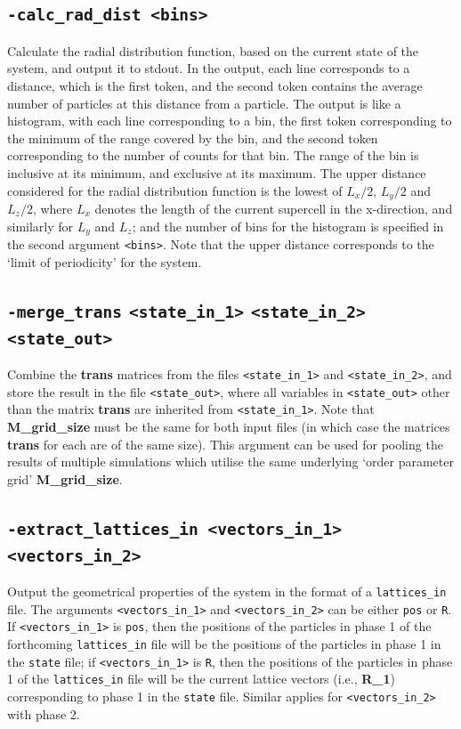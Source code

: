 \documentclass{report}
\begin{document}
\subsection{\texttt{-calc\_rad\_dist <bins>}}
Calculate the radial distribution function, based on the current state of the system, and output it to stdout. In the output, each line corresponds 
to a distance, which is the first token, and the second token contains the average number of particles at this distance from a particle. The 
output is like a histogram, with each line corresponding to a bin, the first token corresponding to the minimum of the range covered by the 
bin, and the second token corresponding to the number of counts for that bin. The range of the bin is inclusive at its minimum, and 
exclusive at its maximum. The upper distance considered for the radial distribution function is the lowest of $L_x/2$, $L_y/2$ and $L_z/2$,
where $L_x$ denotes the length of the current supercell in the x-direction, and similarly for $L_y$ and $L_z$; and the number of bins for 
the histogram is specified in the second argument \texttt{<bins>}. Note that the upper distance corresponds to the `limit of periodicity' for the system. 

\subsection{\texttt{-merge\_trans} \texttt{<state\_in\_1>}  \texttt{<state\_in\_2>} \texttt{<state\_out>}}
Combine the \textbf{trans} matrices from the files \texttt{<state\_in\_1>} and \texttt{<state\_in\_2>}, and store the result in the 
file \texttt{<state\_out>}, where all variables in \texttt{<state\_out>} other than the matrix \textbf{trans} are inherited from 
\texttt{<state\_in\_1>}. Note that \textbf{M\_grid\_size} must be the same for both input files (in which case the matrices \textbf{trans} for
each are of the same size). This argument can be used for pooling the results of multiple simulations which utilise the same underlying
`order parameter grid' \textbf{M\_grid\_size}.

\subsection{\texttt{-extract\_lattices\_in <vectors\_in\_1> <vectors\_in\_2>}}
Output the geometrical properties of the system in the format of a \texttt{lattices\_in} file. The arguments \texttt{<vectors\_in\_1>}
and \texttt{<vectors\_in\_2>} can be either \texttt{pos} or \texttt{R}. If \texttt{<vectors\_in\_1>} is \texttt{pos}, then
the positions of the particles in phase 1 of the forthcoming \texttt{lattices\_in} file will be the positions of the particles in phase 1
in the \texttt{state} file; if \texttt{<vectors\_in\_1>} is \texttt{R}, then the positions of the particles in phase 1 of the 
\texttt{lattices\_in} file will be the current lattice vectors (i.e., \textbf{R\_1}) corresponding to phase 1 in the \texttt{state} file.
Similar applies for \texttt{<vectors\_in\_2>} with phase 2.
\end{document}
